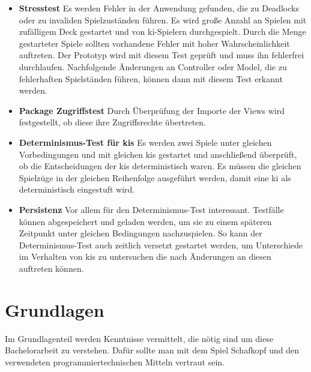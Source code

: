 \documentclass[
							a4paper, 
							11pt, 
							openany, 
							liststotoc,
							parskip=half, 
   							headings=normal
						]{scrreprt}
\begin{document}
{\begin{itemize}
	\item \textbf{Stresstest}\newline
Es werden Fehler in der Anwendung gefunden, die zu Deadlocks oder zu invaliden Spielzuständen führen. Es wird große Anzahl an Spielen mit zufälligem Deck gestartet und von \acs{ki}-Spielern durchgespielt. Durch die Menge gestarteter Spiele sollten vorhandene Fehler mit hoher Wahrscheinlichkeit auftreten.
Der Prototyp wird mit diesem Test geprüft und muss ihn fehlerfrei durchlaufen. Nachfolgende Änderungen an Controller oder Model, die zu fehlerhaften Spielständen führen, können dann mit diesem Test erkannt werden.
	\item \textbf{Package Zugriffstest}\newline
Durch Überprüfung der Importe der Views wird festgestellt, ob diese ihre Zugriffsrechte übertreten. 
	\item \textbf{Determinismus-Test für \acs{ki}s}\newline
Es werden zwei Spiele unter gleichen Vorbedingungen und mit gleichen \acs{ki}s gestartet und anschließend überprüft, ob die Entscheidungen der \acs{ki}s deterministisch waren. Es müssen die gleichen Spielzüge in der gleichen Reihenfolge ausgeführt werden, damit eine \acs{ki} als deterministisch eingestuft wird.
	\item \textbf{Persistenz}\newline
Vor allem für den Determinismus-Test interessant. Testfälle können abgespeichert und geladen werden, um sie zu einem späteren Zeitpunkt unter gleichen Bedingungen nachzuspielen. So kann der Determinismus-Test auch zeitlich versetzt gestartet werden, um Unterschiede im Verhalten von \acs{ki}s zu untersuchen die nach Änderungen an diesen auftreten können.
\end{itemize}\bigskip

\clearpage



\chapter{Grundlagen} \label{ch:grundlagen}
Im Grundlagenteil werden Kenntnisse vermittelt, die nötig sind um diese Bachelorarbeit zu verstehen. Dafür sollte man mit dem Spiel Schafkopf und den verwendeten programmiertechnischen Mitteln vertraut sein.

}
\end{document}
